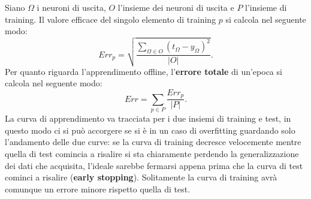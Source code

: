 \documentclass[12pt, twoside, letterpaper]{report}
\begin{document}
				Siano $\Omega$ i neuroni di uscita, $O$ l'insieme dei neuroni di uscita e $P$ l'insieme di training. Il valore efficace del singolo elemento di training $p$ si calcola nel seguente modo: $$Err_p = \sqrt{\frac{\sum_{\Omega \in O} (t_{\Omega} - y_{\Omega})^2}{|O|}}.$$
				Per quanto riguarda l'apprendimento offline, l'\textbf{errore totale} di un'epoca si calcola nel seguente modo: $$Err = \sum_{p \in P} \frac{Err_p}{|P|}.$$ 
				La curva di apprendimento va tracciata per i due insiemi di training e test, in questo modo ci si può accorgere se si è in un caso di overfitting guardando solo l'andamento delle due curve: se la curva di training decresce velocemente mentre quella di test comincia a risalire si sta chiaramente perdendo la generalizzazione dei dati che acquisita, l'ideale sarebbe fermarsi appena prima che la curva di test cominci a risalire (\textbf{early stopping}). Solitamente la curva di training avrà comunque un errore minore rispetto quella di test. %
\end{document}
